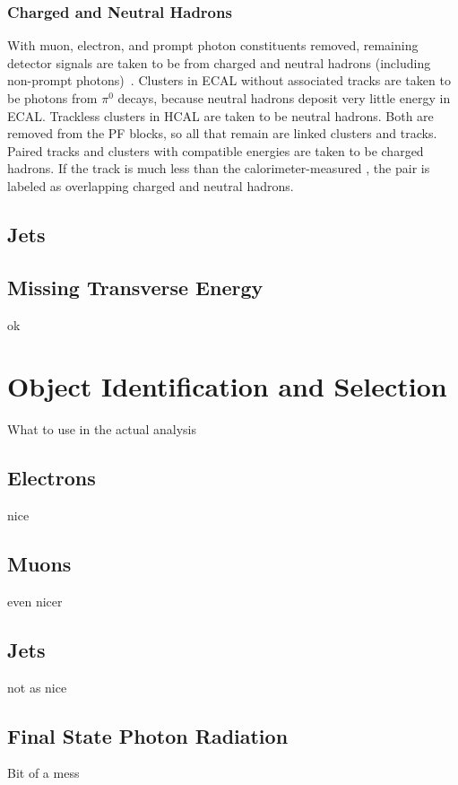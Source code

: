 \subsubsection{Charged and Neutral Hadrons}

With muon, electron, and prompt photon constituents removed, remaining detector signals are taken to be from charged and neutral hadrons (including non-prompt photons)~\cite{CMS:2009nxa,Sirunyan:2017ulk}.
Clusters in ECAL without associated tracks are taken to be photons from $\pi^0$ decays, because neutral hadrons deposit very little energy in ECAL\@.
Trackless clusters in HCAL are taken to be neutral hadrons.
Both are removed from the PF blocks, so all that remain are linked clusters and tracks.
Paired tracks and clusters with compatible energies are taken to be charged hadrons.
If the track {\pt} is much less than the calorimeter-measured {\pt}, the pair is labeled as overlapping charged and neutral hadrons.


\subsection{Jets}




\subsection{Missing Transverse Energy}
ok



\section{Object Identification and Selection}
What to use in the actual analysis

\subsection{Electrons}
nice


\subsection{Muons}
even nicer


\subsection{Jets}
not as nice


\subsection{Final State Photon Radiation}
Bit of a mess


